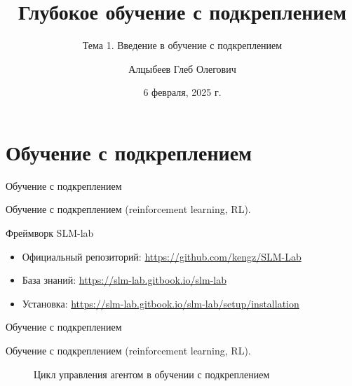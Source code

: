 \documentclass[10pt,aspectratio=169]{beamer}
\title{Глубокое обучение с подкреплением}
\subtitle{Тема 1. Введение в обучение с подкреплением}
\author{Алцыбеев Глеб Олегович}
\date{6 февраля, 2025 г.}
\begin{document}
\maketitle

\section{Обучение с подкреплением}

\begin{frame}{Обучение с подкреплением}
	
	Обучение с подкреплением (reinforcement learning, RL).
	
\end{frame}

\begin{frame}{Фреймворк SLM-lab}
	\begin{itemize}
		\item Официальный репозиторий: \url{https://github.com/kengz/SLM-Lab}
		\item База знаний: \url{https://slm-lab.gitbook.io/slm-lab}
		\item Установка: \url{https://slm-lab.gitbook.io/slm-lab/setup/installation}
	\end{itemize}

\end{frame}


\begin{frame}{Обучение с подкреплением}
	
	Обучение с подкреплением (reinforcement learning, RL).
	
	\begin{center}
		\begin{figure}
			\caption{Цикл управления агентом в обучении с подкреплением}
			\label{fig:example}
		\end{figure}
	\end{center}
\end{frame}
\end{document}
